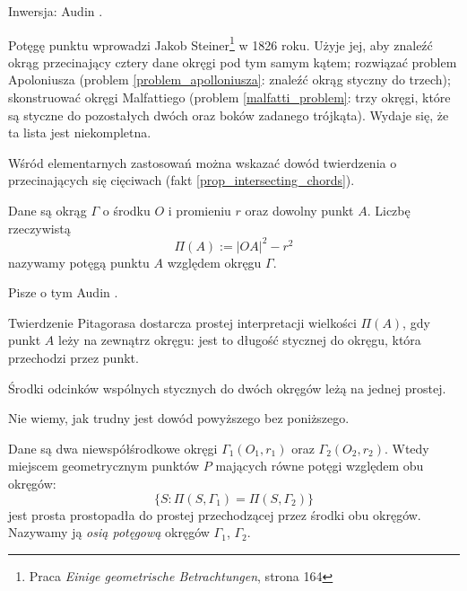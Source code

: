 
Inwersja: Audin \cite[s. 84]{audin_2003}.


Potęgę punktu wprowadzi Jakob Steiner\footnote{Praca \emph{Einige geometrische Betrachtungen}, strona 164} w 1826 roku.
%
Użyje jej, aby znaleźć okrąg przecinający cztery dane okręgi pod tym samym kątem; rozwiązać problem Apoloniusza (problem \ref{problem_apolloniusza}: znaleźć okrąg styczny do trzech); skonstruować okręgi Malfattiego (problem \ref{malfatti_problem}: trzy okręgi, które są styczne do pozostałych dwóch oraz boków zadanego trójkąta).
%
%
Wydaje się, że ta lista jest niekompletna.

Wśród elementarnych zastosowań można wskazać dowód twierdzenia o przecinających się cięciwach (fakt \ref{prop_intersecting_chords}).

\begin{definition}
	\label{def_power_point}
	Dane są okrąg $\Gamma$ o środku $O$ i promieniu $r$ oraz dowolny punkt $A$.
	Liczbę rzeczywistą
	\begin{equation}
		\Pi(A) := |OA|^2 - r^2
	\end{equation}
	nazywamy potęgą punktu $A$ względem okręgu $\Gamma$.
\end{definition}

Pisze o tym Audin \cite[s. 89]{audin_2003}.

Twierdzenie Pitagorasa dostarcza prostej interpretacji wielkości $\Pi(A)$, gdy punkt $A$ leży na zewnątrz okręgu: jest to długość stycznej do okręgu, która przechodzi przez punkt.

\begin{proposition}
	Środki odcinków wspólnych stycznych do dwóch okręgów leżą na jednej prostej. %
\end{proposition}

Nie wiemy, jak trudny jest dowód powyższego bez poniższego.

\begin{proposition}
\label{guzicki_6_11}%
    Dane są dwa niewspółśrodkowe okręgi $\Gamma_1(O_1, r_1)$ oraz $\Gamma_2(O_2, r_2)$.
    Wtedy miejscem geometrycznym punktów $P$ mających równe potęgi względem obu okręgów:
	\begin{equation}
		\{S : \Pi(S, \Gamma_1) = \Pi(S, \Gamma_2)\}
	\end{equation}
	jest prosta prostopadła do prostej przechodzącej przez środki obu okręgów.
	Nazywamy ją \emph{osią potęgową} okręgów $\Gamma_1$, $\Gamma_2$.
\end{proposition}

